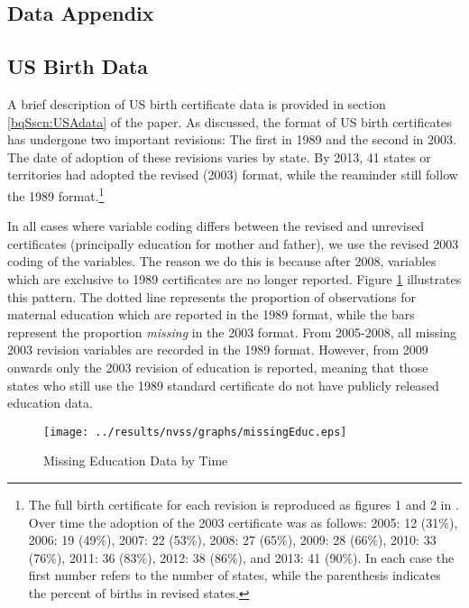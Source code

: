 \documentclass[a4paper, 12 pt]{article}
\theoremstyle{plain}
\begin{document}
\begin{doublespace}
\section{Data Appendix}
\label{bqScn:datApp}
\subsection{US Birth Data}
A brief description of US birth certificate data is provided in section
\ref{bqSscn:USAdata} of the paper.  As discussed, the format of US birth
certificates has undergone two important revisions: The first in 1989
and the second in 2003.  The date of adoption of these revisions varies
by state.  By 2013, 41 states or territories had adopted the revised (2003)
format, while the reaminder still follow the 1989 format.\footnote{The full
birth certificate for each revision is reproduced as figures 1 and 2 in
\citet{MenackerMartin2005}.  Over time the adoption of the 2003 certificate
was as follows: 2005: 12 (31\%), 2006: 19 (49\%), 2007: 22 (53\%), 2008: 27
(65\%), 2009: 28 (66\%), 2010: 33 (76\%), 2011: 36 (83\%), 2012: 38 (86\%),
and 2013: 41 (90\%).  In each case the first number refers to the number
of states, while the parenthesis indicates the percent of births in revised
states.}

In all cases where variable coding differs between the revised and unrevised
certificates (principally education for mother and father), we use the revised
2003 coding of the variables.  The reason we do this is because after 2008,
variables which are exclusive to 1989 certificates are no longer reported.
Figure \ref{bqFig:educMissing} illustrates this pattern.  The dotted line
represents the proportion of observations for maternal education which are
reported in the 1989 format, while the bars represent the proportion
\emph{missing} in the 2003 format.  From 2005-2008, all missing 2003 revision
variables are recorded in the 1989 format.  However, from 2009 onwards only
the 2003 revision of education is reported, meaning that those states who
still use the 1989 standard certificate do not have publicly released education
data.  %




\begin{figure}[htpb!]
\caption{Missing Education Data by Time}
\label{bqFig:educMissing}
\texttt{[image: ../results/nvss/graphs/missingEduc.eps]}
\end{figure}
%



\end{doublespace}
\end{document}
